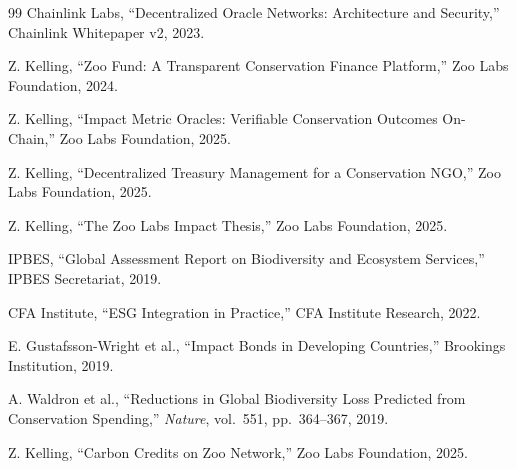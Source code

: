 \documentclass[11pt,letterpaper]{article}
\begin{document}
\begin{thebibliography}{99}
Chainlink Labs, ``Decentralized Oracle Networks: Architecture and Security,'' Chainlink Whitepaper v2, 2023.

Z. Kelling, ``Zoo Fund: A Transparent Conservation Finance Platform,'' Zoo Labs Foundation, 2024.

Z. Kelling, ``Impact Metric Oracles: Verifiable Conservation Outcomes On-Chain,'' Zoo Labs Foundation, 2025.

Z. Kelling, ``Decentralized Treasury Management for a Conservation NGO,'' Zoo Labs Foundation, 2025.

Z. Kelling, ``The Zoo Labs Impact Thesis,'' Zoo Labs Foundation, 2025.

IPBES, ``Global Assessment Report on Biodiversity and Ecosystem Services,'' IPBES Secretariat, 2019.

CFA Institute, ``ESG Integration in Practice,'' CFA Institute Research, 2022.

E. Gustafsson-Wright et al., ``Impact Bonds in Developing Countries,'' Brookings Institution, 2019.

A. Waldron et al., ``Reductions in Global Biodiversity Loss Predicted from Conservation Spending,'' \emph{Nature}, vol.\ 551, pp.\ 364--367, 2019.

Z. Kelling, ``Carbon Credits on Zoo Network,'' Zoo Labs Foundation, 2025.

\end{thebibliography}
\end{document}
